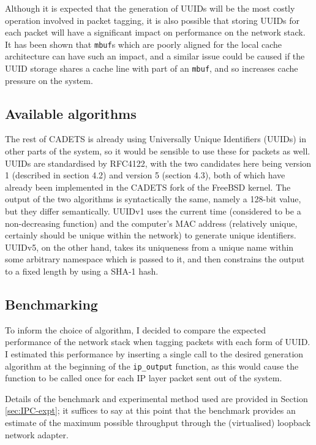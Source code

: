 \documentclass[a4paper,12pt,twoside,openright]{report}
\begin{document}
	Although it is expected that the generation of UUIDs will be the most costly operation involved in packet tagging, it is also possible that storing UUIDs for each packet will have a significant impact on performance on the network stack. It has been shown that \verb|mbuf|s which are poorly aligned for the local cache architecture can have such an impact, and a similar issue could be caused if the UUID storage shares a cache line with part of an \verb|mbuf|, and so increases cache pressure on the system.
	
	\subsection{Available algorithms}
	
	The rest of CADETS is already using Universally Unique Identifiers (UUIDs) in other parts of the system, so it would be sensible to use these for packets as well. UUIDs are standardised by RFC4122\cite{RFC4122}, with the two candidates here being version 1 (described in section 4.2) and version 5 (section 4.3), both of which have already been implemented in the CADETS fork of the FreeBSD kernel. The output of the two algorithms is syntactically the same, namely a 128-bit value, but they differ semantically. UUIDv1 uses the current time (considered to be a non-decreasing function) and the computer's MAC address (relatively unique, certainly should be unique within the network) to generate unique identifiers. UUIDv5, on the other hand, takes its uniqueness from a unique name within some arbitrary namespace which is passed to it, and then constrains the output to a fixed length by using a SHA-1 hash.
	
	\subsection{Benchmarking}
	
	To inform the choice of algorithm, I decided to compare the expected performance of the network stack when tagging packets with each form of UUID. I estimated this performance by inserting a single call to the desired generation algorithm at the beginning of the \verb|ip_output| function, as this would cause the function to be called once for each IP layer packet sent out of the system.
	
	Details of the benchmark and experimental method used are provided in Section \ref{sec:IPC-expt}; it suffices to say at this point that the benchmark provides an estimate of the maximum possible throughput through the (virtualised) loopback network adapter.
	
\end{document}
